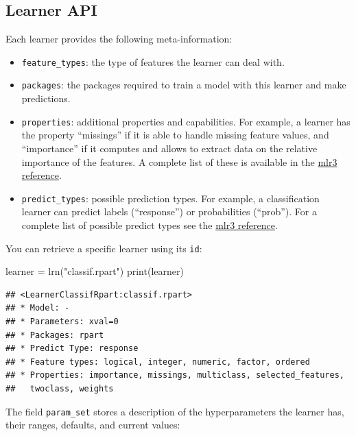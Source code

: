 \documentclass[
]{scrbook}
\newenvironment{Shaded}{\begin{snugshade}}{\end{snugshade}}
\newcommand{\FunctionTok}[1]{\textcolor[rgb]{0.00,0.00,0.00}{#1}}
\newcommand{\NormalTok}[1]{#1}
\newcommand{\OtherTok}[1]{\textcolor[rgb]{0.56,0.35,0.01}{#1}}
\newcommand{\StringTok}[1]{\textcolor[rgb]{0.31,0.60,0.02}{#1}}
\providecommand{\tightlist}{%
  \setlength{\itemsep}{0pt}\setlength{\parskip}{0pt}}
\renewenvironment{Shaded} {\begin{snugshade}\small} {\end{snugshade}}
\begin{document}
\hypertarget{learner-api}{%
\subsection{Learner API}\label{learner-api}}

Each learner provides the following meta-information:

\begin{itemize}
\tightlist
\item
  \texttt{feature\_types}: the type of features the learner can deal with.
\item
  \texttt{packages}: the packages required to train a model with this learner and make predictions.
\item
  \texttt{properties}: additional properties and capabilities.
  For example, a learner has the property ``missings'' if it is able to handle missing feature values, and ``importance'' if it computes and allows to extract data on the relative importance of the features.
  A complete list of these is available in the \href{https://mlr3.mlr-org.com/reference/mlr_reflections.html\#examples}{mlr3 reference}.
\item
  \texttt{predict\_types}: possible prediction types. For example, a classification learner can predict labels (``response'') or probabilities (``prob''). For a complete list of possible predict types see the \href{https://mlr3.mlr-org.com/reference/mlr_reflections.html\#examples}{mlr3 reference}.
\end{itemize}

You can retrieve a specific learner using its \texttt{id}:

\begin{Shaded}
\begin{Highlighting}[]
\NormalTok{learner }\OtherTok{=} \FunctionTok{lrn}\NormalTok{(}\StringTok{"classif.rpart"}\NormalTok{)}
\FunctionTok{print}\NormalTok{(learner)}
\end{Highlighting}
\end{Shaded}

\begin{verbatim}
## <LearnerClassifRpart:classif.rpart>
## * Model: -
## * Parameters: xval=0
## * Packages: rpart
## * Predict Type: response
## * Feature types: logical, integer, numeric, factor, ordered
## * Properties: importance, missings, multiclass, selected_features,
##   twoclass, weights
\end{verbatim}

The field \texttt{param\_set} stores a description of the hyperparameters the learner has, their ranges, defaults, and current values:
\end{document}
